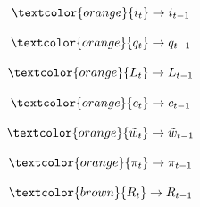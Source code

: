 \begin{equation*}
    \textcolor{orange}{i_t} \rightarrow i_{t-1}
\end{equation*}

\begin{equation*}
    \textcolor{orange}{q_t} \rightarrow q_{t-1}
\end{equation*}

\begin{equation*}
    \textcolor{orange}{L_t} \rightarrow L_{t-1}
\end{equation*}

\begin{equation*}
    \textcolor{orange}{c_t} \rightarrow c_{t-1}
\end{equation*}

\begin{equation*}
    \textcolor{orange}{\tilde{w}_t} \rightarrow \tilde{w}_{t-1}
\end{equation*}


\begin{equation*}
    \textcolor{orange}{\pi_t} \rightarrow \pi_{t-1}
\end{equation*}


\begin{equation*}
    \textcolor{brown}{R_t} \rightarrow R_{t-1}
\end{equation*}






\newpage

